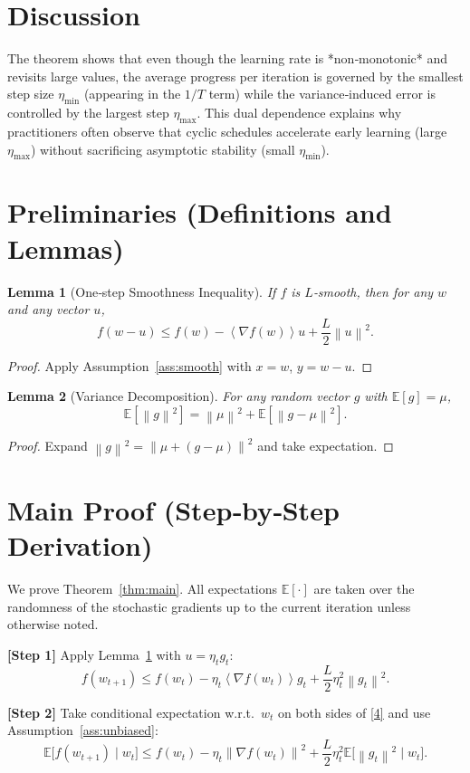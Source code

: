 \documentclass{article}
\newcommand{\E}{\mathbb{E}}
\newcommand{\norm}[1]{\left\| #1 \right\|}
\newcommand{\inner}[1]{\left\langle #1 \right\rangle}
\newtheorem{lemma}{Lemma}
\begin{document}
\section*{Discussion}
The theorem shows that even though the learning rate is *non‑monotonic* and revisits large values, the average progress per iteration is governed by the smallest step size $\eta_{\min}$ (appearing in the $1/T$ term) while the variance‑induced error is controlled by the largest step $\eta_{\max}$. This dual dependence explains why practitioners often observe that cyclic schedules accelerate early learning (large $\eta_{\max}$) without sacrificing asymptotic stability (small $\eta_{\min}$).

\newpage

\section*{Preliminaries (Definitions and Lemmas)}
\begin{lemma}[One‑step Smoothness Inequality]\label{lem:smooth}
If $f$ is $L$‑smooth, then for any $w$ and any vector $u$,
\[
f(w-u)\le f(w)-\inner{\nabla f(w)}{u}+\frac{L}{2}\norm{u}^2 .
\]
\end{lemma}
\begin{proof}
Apply Assumption~\ref{ass:smooth} with $x=w$, $y=w-u$.
\end{proof}

\begin{lemma}[Variance Decomposition]\label{lem:var}
For any random vector $g$ with $\E[g]=\mu$,
\[
\E[\norm{g}^2]=\norm{\mu}^2+\E[\norm{g-\mu}^2].
\]
\end{lemma}
\begin{proof}
Expand $\norm{g}^2=\norm{\mu+(g-\mu)}^2$ and take expectation.
\end{proof}

\section*{Main Proof (Step‑by‑Step Derivation)}
We prove Theorem~\ref{thm:main}.  All expectations $\E[\cdot]$ are taken over the randomness of the stochastic gradients up to the current iteration unless otherwise noted.

\noindent\textbf{[Step 1]} Apply Lemma~\ref{lem:smooth} with $u=\eta_t g_t$:
\[
f(w_{t+1})\le f(w_t)-\eta_t\inner{\nabla f(w_t)}{g_t}
+\frac{L}{2}\eta_t^{2}\norm{g_t}^{2}.
\tag{4}
\]

\noindent\textbf{[Step 2]} Take conditional expectation w.r.t.\ $w_t$ on both sides of \eqref{4} and use Assumption~\ref{ass:unbiased}:
\[
\E\!\big[f(w_{t+1})\mid w_t\big]\le
f(w_t)-\eta_t\norm{\nabla f(w_t)}^{2}
+\frac{L}{2}\eta_t^{2}\E\!\big[\norm{g_t}^{2}\mid w_t\big].
\tag{5}
\]
\end{document}
